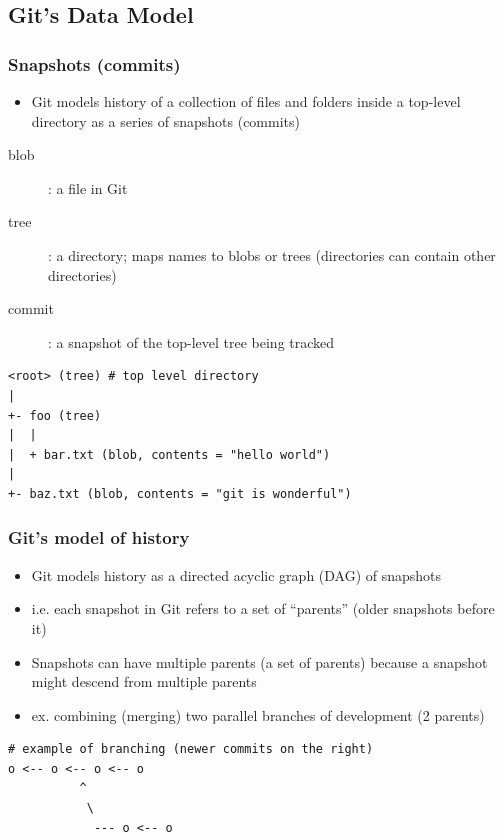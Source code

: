 \documentclass[letterpaper,12pt]{article}
\begin{document}
\subsection{Git's Data Model}

\subsubsection{Snapshots (commits)}
\begin{itemize}
 \item Git models history of a collection of files and folders inside a top-level directory as a series of snapshots (commits)
\end{itemize}

\begin{description}
 \item[blob]: a file in Git
 \item[tree]: a directory; maps names to blobs or trees (directories can contain other directories)
 \item[commit]: a snapshot of the top-level tree being tracked
\end{description}

\begin{lstlisting}
<root> (tree) # top level directory
|
+- foo (tree)
|  |
|  + bar.txt (blob, contents = "hello world")
|
+- baz.txt (blob, contents = "git is wonderful")
\end{lstlisting}

\subsubsection{Git's model of history}
\begin{itemize}
 \item Git models history as a directed acyclic graph (DAG) of snapshots
 \item i.e. each snapshot in Git refers to a set of ``parents'' (older snapshots before it)
 \item Snapshots can have multiple parents (a set of parents) because a snapshot might descend from multiple parents
 \item ex. combining (merging) two parallel branches of development (2 parents)
\end{itemize}


\begin{lstlisting}
# example of branching (newer commits on the right)
o <-- o <-- o <-- o
          ^
           \
            --- o <-- o
\end{lstlisting}
\end{document}
